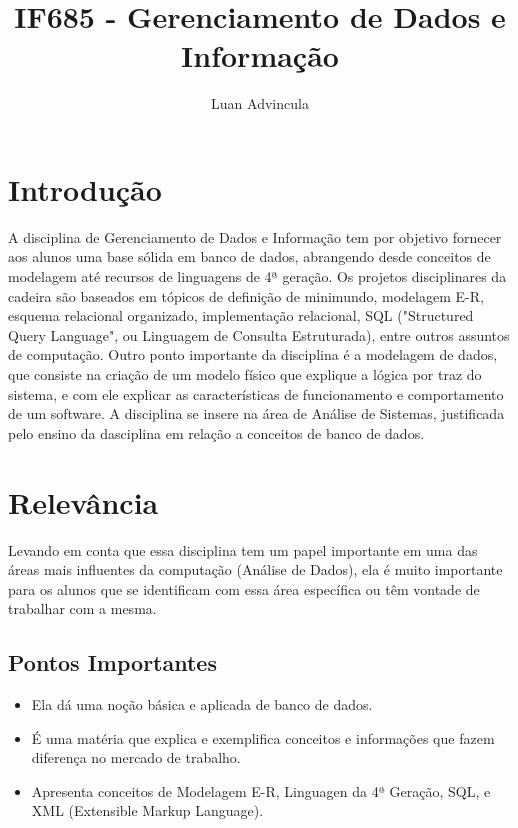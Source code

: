 \documentclass[a4paper]{article}
\title{IF685 - Gerenciamento de Dados e Informação}
\author{Luan Advincula}
\begin{document}
\maketitle


\section{Introdução}

A disciplina de Gerenciamento de Dados e Informação tem por objetivo fornecer aos alunos uma base sólida em banco de dados, abrangendo desde conceitos de modelagem até recursos de linguagens de 4ª geração. Os projetos disciplinares da cadeira são baseados em tópicos de definição de minimundo, modelagem E-R, esquema relacional organizado, implementação relacional, SQL ("Structured Query Language", ou Linguagem de Consulta Estruturada), entre outros assuntos de computação.\cite{1} Outro ponto importante da disciplina é a modelagem de dados, que consiste na criação de um modelo físico que explique a lógica por traz do sistema, e com ele explicar as características de funcionamento e comportamento de um software.\cite{2} A disciplina se insere na área de Análise de Sistemas, justificada pelo ensino da dasciplina em relação a conceitos de banco de dados.\cite{3}  


\section{Relevância}

Levando em conta que essa disciplina tem um papel importante em uma das áreas mais influentes da computação (Análise de Dados), ela é muito importante para os alunos que se identificam com essa área específica ou têm vontade de trabalhar com a mesma.

\subsection{Pontos Importantes}
\begin{itemize}
\item Ela dá uma noção básica e aplicada de banco de dados.
\item É uma matéria que explica e exemplifica conceitos e informações que fazem diferença no mercado de trabalho.
\item Apresenta conceitos de Modelagem E-R, Linguagen da 4ª Geração, SQL, e XML (Extensible Markup Language).

\end{itemize}
\end{document}
